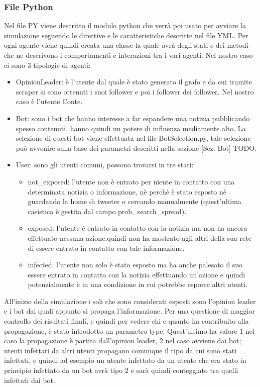         \subsubsection{File Python}
        Nel file PY viene descritto il modulo python che verrà poi usato per avviare la simulazione seguendo le direttive e le caratteristiche descritte nel file YML. Per ogni agente viene quindi creata una classe la quale avrà degli stati e dei metodi che ne descrivono i comportamenti e interazioni tra i vari agenti. Nel nostro caso ci sono 3 tipologie di agenti:
        \begin{itemize}
        \item OpinionLeader: è l’utente dal quale è stato generato il grafo e da cui tramite scraper si sono ottenuti i suoi follower e poi i follower dei follower. Nel nostro caso è l’utente Conte.
        \item Bot: sono i bot che hanno interesse a far espandere una notizia pubblicando spesso contenuti, hanno quindi un potere di influenza mediamente alto. La selezione di questi bot viene effettuata nel file BotSelection.py, tale selezione può avvenire sulla base dei parametri descritti nella sezione [Sez. Bot] TODO.
        \item User: sono gli utenti comuni, possono trovarsi in tre stati:
          \begin{itemize}
          \item not_exposed: l’utente non è entrato per niente in contatto con una determinata notizia o informazione, nè perchè è stato esposto nè guardando la home di tweeter o cercando manualmente (quest’ultima casistica è gestita dal campo prob_search_spread).
          \item exposed: l’utente è entrato in contatto con la notizia ma non ha ancora effettuato nessuna azione,quindi non ha mostrato agli altri della sua rete di essere entrato in contatto con tale informazione.
          \item infected: l’utente non solo è stato esposto ma ha anche palesato il suo essere entrato in contatto con la notizia effettuando un'azione e quindi potenzialmente è in una condizione in cui potrebbe esporre altri utenti.
          \end{itemize}
        \end{itemize}
        All’inizio della simulazione i soli che sono considerati esposti sono l’opinion leader e i bot dai quali appunto si propaga l’informazione. Per una questione di maggior controllo dei risultati finali, e quindi per vedere chi e quanto ha contribuito alla propagazione, è stato introdotto un parametro type. Quest’ultimo ha valore 1 nel caso la propagazione è partita dall’opinion leader, 2 nel caso avviene dai bot; utenti infettati da altri utenti propagano comunque il tipo da cui sono stati infettati, e quindi ad esempio un utente infettato da un utente che era stato in principio infettato da un bot avrà tipo 2 e sarà quindi conteggiato tra quelli infettati dai bot.
